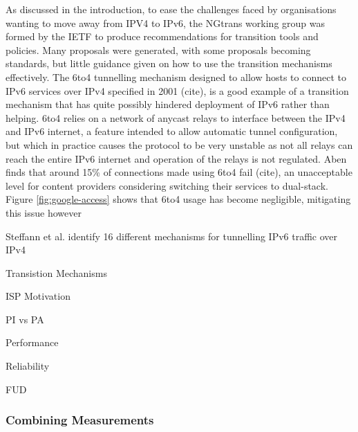 As discussed in the introduction, to ease the challenges faced by organisations
wanting to move away from IPV4 to IPv6, the NGtrans working group was formed by
the IETF to produce recommendations for transition tools and policies. Many
proposals were generated, with some proposals becoming standards, but little
guidance given on how to use the transition mechanisms effectively. The 6to4
tunnelling mechanism designed to allow hosts to connect to IPv6 services over
IPv4 specified in 2001 (cite), is a good example of a transition mechanism that
has quite possibly hindered deployment of IPv6 rather than helping. 6to4 relies
on a network of anycast relays to interface between the IPv4 and IPv6 internet,
a feature intended to allow automatic tunnel configuration, but which in
practice causes the protocol to be very unstable as not all relays can reach the
entire IPv6 internet and operation of the relays is not regulated. Aben finds
that around 15\% of connections made using 6to4 fail (cite), an unacceptable
level for content providers considering switching their services to dual-stack.
Figure \ref{fig:google-access} shows that 6to4 usage has become negligible,
mitigating this issue however 

Steffann et al.
identify 16 different mechanisms for tunnelling IPv6 traffic over IPv4

Transistion Mechanisms

ISP Motivation

PI vs PA

Performance

Reliability

FUD

\subsubsection{Combining Measurements}



